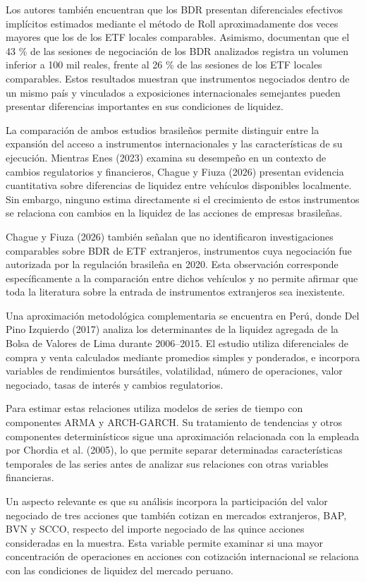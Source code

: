 Los autores también encuentran que los BDR presentan diferenciales efectivos implícitos estimados mediante el método de Roll aproximadamente dos veces mayores que los de los ETF locales comparables. Asimismo, documentan que el 43 \% de las sesiones de negociación de los BDR analizados registra un volumen inferior a 100 mil reales, frente al 26 \% de las sesiones de los ETF locales comparables. Estos resultados muestran que instrumentos negociados dentro de un mismo país y vinculados a exposiciones internacionales semejantes pueden presentar diferencias importantes en sus condiciones de liquidez.

La comparación de ambos estudios brasileños permite distinguir entre la expansión del acceso a instrumentos internacionales y las características de su ejecución. Mientras Enes (2023) examina su desempeño en un contexto de cambios regulatorios y financieros, Chague y Fiuza (2026) presentan evidencia cuantitativa sobre diferencias de liquidez entre vehículos disponibles localmente. Sin embargo, ninguno estima directamente si el crecimiento de estos instrumentos se relaciona con cambios en la liquidez de las acciones de empresas brasileñas.

Chague y Fiuza (2026) también señalan que no identificaron investigaciones comparables sobre BDR de ETF extranjeros, instrumentos cuya negociación fue autorizada por la regulación brasileña en 2020. Esta observación corresponde específicamente a la comparación entre dichos vehículos y no permite afirmar que toda la literatura sobre la entrada de instrumentos extranjeros sea inexistente.

Una aproximación metodológica complementaria se encuentra en Perú, donde Del Pino Izquierdo (2017) analiza los determinantes de la liquidez agregada de la Bolsa de Valores de Lima durante 2006--2015. El estudio utiliza diferenciales de compra y venta calculados mediante promedios simples y ponderados, e incorpora variables de rendimientos bursátiles, volatilidad, número de operaciones, valor negociado, tasas de interés y cambios regulatorios.

Para estimar estas relaciones utiliza modelos de series de tiempo con componentes ARMA y ARCH-GARCH. Su tratamiento de tendencias y otros componentes determinísticos sigue una aproximación relacionada con la empleada por Chordia et al. (2005), lo que permite separar determinadas características temporales de las series antes de analizar sus relaciones con otras variables financieras.

Un aspecto relevante es que su análisis incorpora la participación del valor negociado de tres acciones que también cotizan en mercados extranjeros, BAP, BVN y SCCO, respecto del importe negociado de las quince acciones consideradas en la muestra. Esta variable permite examinar si una mayor concentración de operaciones en acciones con cotización internacional se relaciona con las condiciones de liquidez del mercado peruano.

